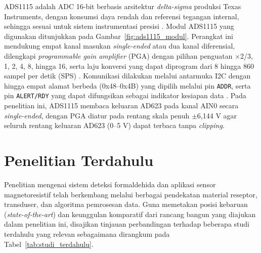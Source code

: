 ADS1115 adalah ADC 16-bit berbasis arsitektur \textit{delta-sigma} produksi Texas Instruments, dengan konsumsi daya rendah dan referensi tegangan internal, sehingga sesuai untuk sistem instrumentasi presisi \cite{ti_ads1115}. Modul ADS1115 yang digunakan ditunjukkan pada Gambar~\ref{fig:ads1115_modul}. Perangkat ini mendukung empat kanal masukan \textit{single-ended} atau dua kanal diferensial, dilengkapi \textit{programmable gain amplifier} (PGA) dengan pilihan penguatan $\times$2/3, 1, 2, 4, 8, hingga 16, serta laju konversi yang dapat diprogram dari 8 hingga 860 sampel per detik (SPS) \cite{ti_ads1115}. Komunikasi dilakukan melalui antarmuka I2C dengan hingga empat alamat berbeda (0x48--0x4B) yang dipilih melalui pin \texttt{ADDR}, serta pin \texttt{ALERT/RDY} yang dapat difungsikan sebagai indikator kesiapan data \cite{ti_ads1115}. Pada penelitian ini, ADS1115 membaca keluaran AD623 pada kanal AIN0 secara \textit{single-ended}, dengan PGA diatur pada rentang skala penuh $\pm$6,144 V agar seluruh rentang keluaran AD623 (0--5 V) dapat terbaca tanpa \textit{clipping}.

\section{Penelitian Terdahulu}

Penelitian mengenai sistem deteksi formaldehida dan aplikasi sensor magnetoresistif telah berkembang melalui berbagai pendekatan material reseptor, transduser, dan algoritma pemrosesan data. Guna memetakan posisi kebaruan (\textit{state-of-the-art}) dan keunggulan komparatif dari rancang bangun yang diajukan dalam penelitian ini, disajikan tinjauan perbandingan terhadap beberapa studi terdahulu yang relevan sebagaimana dirangkum pada Tabel~\ref{tab:studi_terdahulu}.

